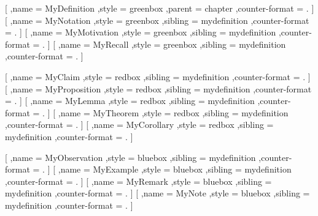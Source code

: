         [
            ,name = MyDefinition
            ,style = greenbox
            ,parent = chapter
            ,counter-format = .
        ]
        [
            ,name = MyNotation
            ,style = greenbox
            ,sibling = mydefinition
            ,counter-format = .
        ]
        [
            ,name = MyMotivation
            ,style = greenbox
            ,sibling = mydefinition
            ,counter-format = .
        ]
        [
            ,name = MyRecall
            ,style = greenbox
            ,sibling = mydefinition
            ,counter-format = .
        ]

        [
            ,name = MyClaim
            ,style = redbox
            ,sibling = mydefinition
            ,counter-format = .
        ]
        [
            ,name = MyProposition
            ,style = redbox
            ,sibling = mydefinition
            ,counter-format = .
        ]
        [
            ,name = MyLemma
            ,style = redbox
            ,sibling = mydefinition
            ,counter-format = .
        ]
        [
            ,name = MyTheorem
            ,style = redbox
            ,sibling = mydefinition
            ,counter-format = .
        ]
        [
            ,name = MyCorollary
            ,style = redbox
            ,sibling = mydefinition
            ,counter-format = .
        ]

        [
            ,name = MyObservation
            ,style = bluebox
            ,sibling = mydefinition
            ,counter-format = .
        ]
        [
            ,name = MyExample
            ,style = bluebox
            ,sibling = mydefinition
            ,counter-format = .
        ]
        [
            ,name = MyRemark
            ,style = bluebox
            ,sibling = mydefinition
            ,counter-format = .
        ]
        [
            ,name = MyNote
            ,style = bluebox
            ,sibling = mydefinition
            ,counter-format = .
        ]

